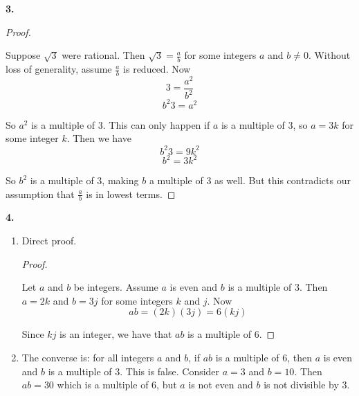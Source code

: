\documentclass[10pt,]{book}
\theoremstyle{plain}
\theoremstyle{definition}
\theoremstyle{definition}
\theoremstyle{definition}
\numberwithin{equation}{chapter}
\begin{document}
\noindent\textbf{3.}\quad{}\begin{proof}\hypertarget{proof-43}{}

Suppose \(\sqrt{3}\) were rational. Then \(\sqrt{3} = \frac{a}{b}\) for some integers \(a\) and \(b \ne 0\). Without loss of generality, assume \(\frac{a}{b}\) is reduced. Now
\begin{equation*}
  3 = \frac{a^2}{b^2}
\end{equation*}
%
\begin{equation*}
  b^2 3 = a^2
\end{equation*}\par

So \(a^2\) is a multiple of 3. This can only happen if \(a\) is a multiple of 3, so \(a = 3k\) for some integer \(k\). Then we have
\begin{equation*}
  b^2 3 = 9k^2
\end{equation*}
%
\begin{equation*}
  b^2 = 3k^2
\end{equation*}\par

So \(b^2\) is a multiple of 3, making \(b\) a multiple of 3 as well. But this contradicts our assumption that \(\frac{a}{b}\) is in lowest terms.
%
\end{proof}
\par\smallskip
\noindent\textbf{4.}\quad{}\leavevmode%
\begin{enumerate}[label=(\alph*)]
\item\hypertarget{li-1111}{}
Direct proof.

\begin{proof}\hypertarget{proof-44}{}

Let \(a\) and \(b\) be integers. Assume \(a\) is even and \(b\) is a multiple of 3. Then \(a = 2k\) and \(b = 3j\) for some integers \(k\) and \(j\). Now
\begin{equation*}
  ab = (2k)(3j) = 6(kj)
\end{equation*}
%
\par

Since \(kj\) is an integer, we have that \(ab\) is a multiple of 6.
%
\end{proof}


%
\item\hypertarget{li-1112}{}
The converse is: for all integers \(a\) and \(b\), if \(ab\) is a multiple of 6, then \(a\) is even and \(b\) is a multiple of 3.  This is false.  Consider \(a = 3\) and \(b = 10\).  Then \(ab = 30\) which is a multiple of 6, but \(a\) is not even and \(b\) is not divisible by 3.
%
\end{enumerate}
\end{document}
